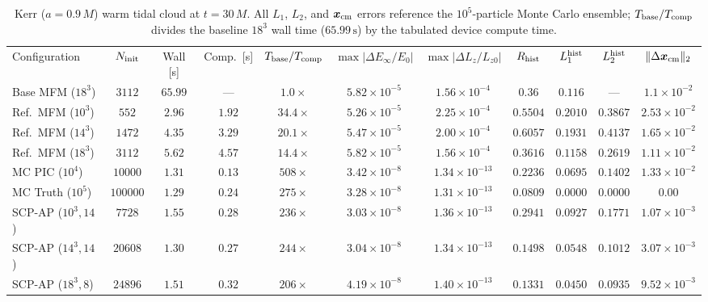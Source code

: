\documentclass[twocolumn,prx,aps,superscriptaddress,nofootinbib,floatfix]{revtex4-2}
\begin{document}
\begin{table}[t]
\caption{\label{tab:supp_kerr}%
Kerr ($a = 0.9\,M$) warm tidal cloud at $t = 30\,M$. All $L_1$, $L_2$, and $\bm{x}_{\rm cm}$ errors reference the $10^5$-particle Monte Carlo ensemble; $T_{\rm base}/T_{\rm comp}$ divides the baseline $18^3$ wall time ($65.99\,\mathrm{s}$) by the tabulated device compute time.}
\scriptsize
\setlength{\tabcolsep}{3.0pt}
\begin{ruledtabular}
\begin{tabular}{lcccccccccc}
Configuration & $N_{\rm init}$ & Wall [s] & Comp.\ [s] & $T_{\rm base}/T_{\rm comp}$ & $\max|\Delta E_\infty/E_0|$ & $\max|\Delta L_z/L_{z0}|$ & $R_{\rm hist}$ & $L_1^{\rm hist}$ & $L_2^{\rm hist}$ & $\|\Delta \bm{x}_{\rm cm}\|_2$ \\
\colrule
Base MFM ($18^3$) & $3112$ & $65.99$ & --- & $1.0\times$ & $5.82\times 10^{-5}$ & $1.56\times 10^{-4}$ & $0.36$ & $0.116$ & --- & $1.1\times 10^{-2}$ \\
Ref.\ MFM ($10^3$) & $552$ & $2.96$ & $1.92$ & $34.4\times$ & $5.26\times 10^{-5}$ & $2.25\times 10^{-4}$ & $0.5504$ & $0.2010$ & $0.3867$ & $2.53\times 10^{-2}$ \\
Ref.\ MFM ($14^3$) & $1472$ & $4.35$ & $3.29$ & $20.1\times$ & $5.47\times 10^{-5}$ & $2.00\times 10^{-4}$ & $0.6057$ & $0.1931$ & $0.4137$ & $1.65\times 10^{-2}$ \\
Ref.\ MFM ($18^3$) & $3112$ & $5.62$ & $4.57$ & $14.4\times$ & $5.82\times 10^{-5}$ & $1.56\times 10^{-4}$ & $0.3616$ & $0.1158$ & $0.2619$ & $1.11\times 10^{-2}$ \\
MC PIC ($10^4$) & $10000$ & $1.31$ & $0.13$ & $508\times$ & $3.42\times 10^{-8}$ & $1.34\times 10^{-13}$ & $0.2236$ & $0.0695$ & $0.1402$ & $1.33\times 10^{-2}$ \\
MC Truth ($10^5$) & $100000$ & $1.29$ & $0.24$ & $275\times$ & $3.28\times 10^{-8}$ & $1.31\times 10^{-13}$ & $0.0809$ & $0.0000$ & $0.0000$ & $0.00$ \\
SCP-AP ($10^3, 14$) & $7728$ & $1.55$ & $0.28$ & $236\times$ & $3.03\times 10^{-8}$ & $1.36\times 10^{-13}$ & $0.2941$ & $0.0927$ & $0.1771$ & $1.07\times 10^{-3}$ \\
SCP-AP ($14^3, 14$) & $20608$ & $1.30$ & $0.27$ & $244\times$ & $3.04\times 10^{-8}$ & $1.34\times 10^{-13}$ & $0.1498$ & $0.0548$ & $0.1012$ & $3.07\times 10^{-3}$ \\
SCP-AP ($18^3, 8$) & $24896$ & $1.51$ & $0.32$ & $206\times$ & $4.19\times 10^{-8}$ & $1.40\times 10^{-13}$ & $0.1331$ & $0.0450$ & $0.0935$ & $9.52\times 10^{-3}$ \\

\end{tabular}
\end{ruledtabular}
\end{table}
\end{document}
